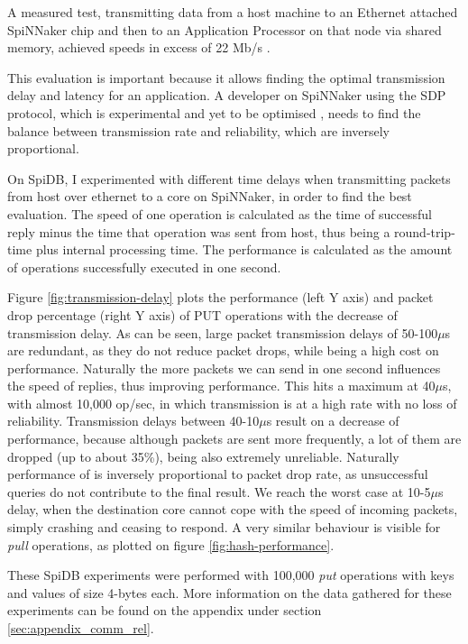 A measured test, transmitting data from a host machine to an Ethernet attached SpiNNaker chip and then to an Application Processor on that node via shared memory, achieved speeds in excess of 22 Mb/s \cite{scalablecomm}.

This evaluation is important because it allows finding the optimal transmission delay and latency for an application. A developer on SpiNNaker using the SDP protocol, which is experimental and yet to be optimised \cite{scalablecomm}, needs to find the balance between transmission rate and reliability, which are inversely proportional.

On SpiDB, I experimented with different time delays when transmitting packets from host over ethernet to a core on SpiNNaker, in order to find the best evaluation. The speed of one operation is calculated as the time of successful reply minus the time that operation was sent from host, thus being a round-trip-time plus internal processing time. The performance is calculated as the amount of operations successfully executed in one second.

Figure \ref{fig:transmission-delay} plots the performance (left Y axis) and packet drop percentage (right Y axis) of PUT operations  with the decrease of transmission delay. As can be seen, large packet transmission delays of 50-100$\mu$s are redundant, as they do not reduce packet drops, while being a high cost on performance. Naturally the more packets we can send in one second influences the speed of replies, thus improving performance. This hits a maximum at 40$\mu$s, with almost 10,000 op/sec, in which transmission is at a high rate with no loss of reliability. Transmission delays between 40-10$\mu$s result on a decrease of performance, because although packets are sent more frequently, a lot of them are dropped (up to about 35\%), being also extremely unreliable. Naturally performance of is inversely proportional to packet drop rate, as unsuccessful queries do not contribute to the final result. We reach the worst case at 10-5$\mu$s delay, when the destination core cannot cope with the speed of incoming packets, simply crashing and ceasing to respond. A very similar behaviour is visible for \textit{pull} operations, as plotted on figure \ref{fig:hash-performance}.

These SpiDB experiments were performed with 100,000 \textit{put} operations with keys and values of size 4-bytes each. More information on the data gathered for these experiments can be found on the appendix under section \ref{sec:appendix_comm_rel}.

